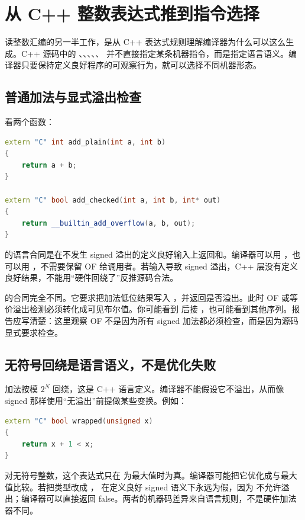 \section{从 C++ 整数表达式推到指令选择}

读整数汇编的另一半工作，是从 C++ 表达式规则理解编译器为什么可以这么生成。C++ 源码中的 \code{+}、\code{-}、\code{*}、\code{/}、\code{<}、\code{>>} 并不直接指定某条机器指令，而是指定语言语义。编译器只要保持定义良好程序的可观察行为，就可以选择不同机器形态。

\subsection{普通加法与显式溢出检查}

看两个函数：

\begin{lstlisting}[language=C++]
extern "C" int add_plain(int a, int b)
{
    return a + b;
}

extern "C" bool add_checked(int a, int b, int* out)
{
    return __builtin_add_overflow(a, b, out);
}
\end{lstlisting}

 的语言合同是在不发生 signed 溢出的定义良好输入上返回和。编译器可以用 ，也可以用 ，不需要保留 OF 给调用者。若输入导致 signed 溢出，C++ 层没有定义良好结果，不能用“硬件回绕了”反推源码合法。

 的合同完全不同。它要求把加法低位结果写入 ，并返回是否溢出。此时 OF 或等价溢出检测必须转化成可见布尔值。你可能看到  后接 ，也可能看到其他序列。报告应写清楚：这里观察 OF 不是因为所有 signed 加法都必须检查，而是因为源码显式要求检查。

\subsection{无符号回绕是语言语义，不是优化失败}

 加法按模 \(2^N\) 回绕，这是 C++ 语言定义。编译器不能假设它不溢出，从而像 signed 那样使用“无溢出”前提做某些变换。例如：

\begin{lstlisting}[language=C++]
extern "C" bool wrapped(unsigned x)
{
    return x + 1 < x;
}
\end{lstlisting}

对无符号整数，这个表达式只在  为最大值时为真。编译器可能把它优化成与最大值比较。若把类型改成 ， 在定义良好 signed 语义下永远为假，因为  不允许溢出；编译器可以直接返回 false。两者的机器码差异来自语言规则，不是硬件加法器不同。

